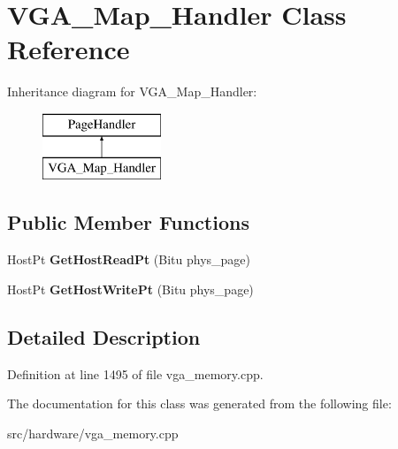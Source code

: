 \hypertarget{classVGA__Map__Handler}{\section{V\-G\-A\-\_\-\-Map\-\_\-\-Handler Class Reference}
\label{classVGA__Map__Handler}
}
Inheritance diagram for V\-G\-A\-\_\-\-Map\-\_\-\-Handler\-:\begin{figure}[H]
\begin{center}
\leavevmode
\includegraphics[height=2.000000cm]{classVGA__Map__Handler}
\end{center}
\end{figure}
\subsection*{Public Member Functions}
\begin{DoxyCompactItemize}
\item 
\hypertarget{classVGA__Map__Handler_a23bc58413fad28c04578297037382551}{Host\-Pt {\bfseries Get\-Host\-Read\-Pt} (Bitu phys\-\_\-page)}\label{classVGA__Map__Handler_a23bc58413fad28c04578297037382551}

\item 
\hypertarget{classVGA__Map__Handler_aaad4aea2654a2d31733a7213894d90a4}{Host\-Pt {\bfseries Get\-Host\-Write\-Pt} (Bitu phys\-\_\-page)}\label{classVGA__Map__Handler_aaad4aea2654a2d31733a7213894d90a4}

\end{DoxyCompactItemize}


\subsection{Detailed Description}


Definition at line 1495 of file vga\-\_\-memory.\-cpp.



The documentation for this class was generated from the following file\-:\begin{DoxyCompactItemize}
\item 
src/hardware/vga\-\_\-memory.\-cpp\end{DoxyCompactItemize}
